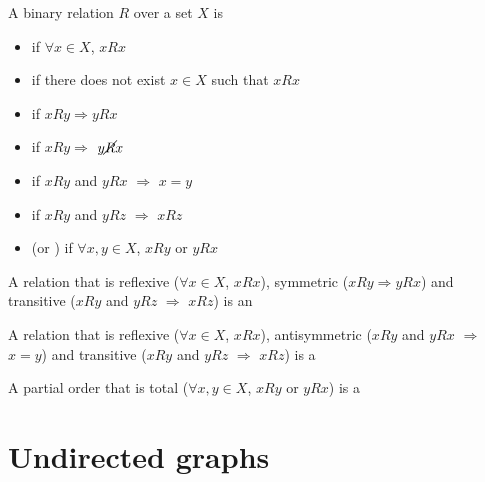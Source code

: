 \documentclass[aspectratio=43]{beamer}
\begin{document}
\begin{frame}
	\begin{definition}
		A binary relation $R$ over a set $X$ is
	\begin{itemize}
	\item {} if $\forall x\in X$, $xRx$
	\item {} if there does not exist $x\in X$ such that $xRx$
	\item {} if $xRy \Rightarrow yRx$
	\item {} if $xRy \Rightarrow $ $y\cancel R x$
	\item {} if $xRy$ and $yRx$ $\Rightarrow$ $x=y$
	\item {} if $xRy$ and $yRz$ $\Rightarrow$  $xRz$
	\item {} (or ) if $\forall x, y\in X$, $x R y$ or $y R x$
	\end{itemize}
	\end{definition}
\end{frame}
	
	
\begin{frame} 
	\begin{definition}
	 A relation that is reflexive ($\forall x\in X$, $xRx$), symmetric ($xRy \Rightarrow yRx$) and transitive ($xRy$ and $yRz$ $\Rightarrow$  $xRz$) is an 
	\end{definition}
	\vfill
	\begin{definition}
	 A relation that is reflexive ($\forall x\in X$, $xRx$), antisymmetric ($xRy$ and $yRx$ $\Rightarrow$ $x=y$) and transitive ($xRy$ and $yRz$ $\Rightarrow$  $xRz$) is a 
	\end{definition}
	\vfill
	\begin{definition}
	A partial order that is total ($\forall x, y\in X$, $x R y$ or $y R x$) is a 
	\end{definition}
\end{frame}
	



\section{Undirected graphs}
\end{document}
